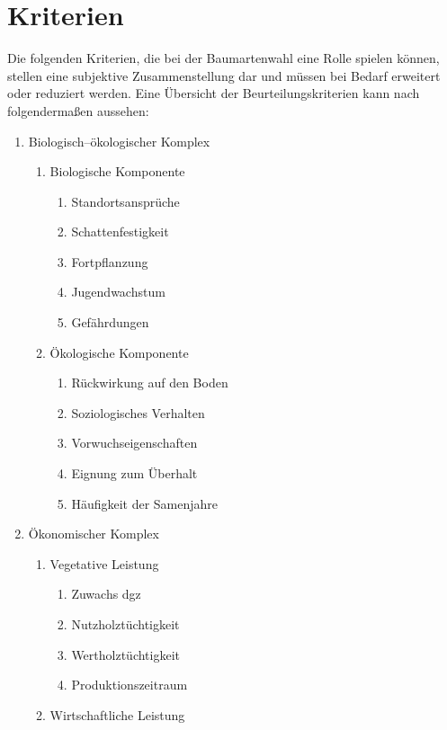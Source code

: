 \documentclass[twocolumn]{scrartcl}
\begin{document}
\section{Kriterien}
\label{sec:kriterien}

Die folgenden Kriterien, die bei der Baumartenwahl eine Rolle spielen können,
stellen eine subjektive Zusammenstellung dar und müssen bei Bedarf erweitert
oder reduziert werden. Eine Übersicht der Beurteilungskriterien kann nach
\citet[Bd.1, S.108]{bauer1962WaldbauAlsWissenschaft} folgendermaßen aussehen:
\begin{enumerate}
\item Biologisch--ökologischer Komplex
  \begin{enumerate}
  \item Biologische Komponente
    \begin{enumerate}
    \item Standortsansprüche
    \item Schattenfestigkeit
    \item Fortpflanzung
    \item Jugendwachstum
    \item Gefährdungen
    \end{enumerate}
  \item Ökologische Komponente
    \begin{enumerate}
    \item Rückwirkung auf den Boden
    \item Soziologisches Verhalten
    \item Vorwuchseigenschaften
    \item Eignung zum Überhalt
    \item Häufigkeit der Samenjahre
    \end{enumerate}
  \end{enumerate}
\item Ökonomischer Komplex
  \begin{enumerate}
  \item Vegetative Leistung
    \begin{enumerate}
    \item Zuwachs dgz
    \item Nutzholztüchtigkeit
    \item Wertholztüchtigkeit
    \item Produktionszeitraum
    \end{enumerate}
  \item Wirtschaftliche Leistung
    \begin{enumerate}

\end{enumerate}
\end{enumerate}
\end{enumerate}
\end{document}
